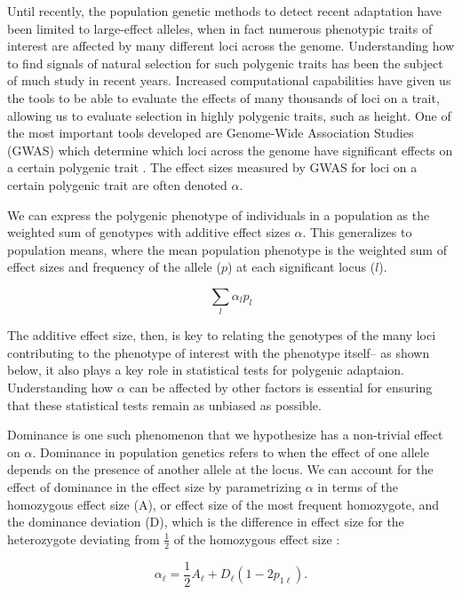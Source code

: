 \documentclass[a4paper,12pt]{article}
\begin{document}
Until recently, the population genetic methods to detect recent adaptation have been limited to
large-effect alleles, when in fact numerous phenotypic traits of interest
are affected by many different loci across the genome. Understanding
how to find signals of natural selection for such polygenic traits has been
the subject of much study in recent years. Increased computational
capabilities have given us the tools to be able to evaluate the effects
of many thousands of loci on a trait, allowing us to evaluate
selection in highly polygenic traits, such as height. One of the most
important tools developed are Genome-Wide Association Studies (GWAS)
which determine which loci across the genome have significant effects
on a certain polygenic trait \cite{gwasoverview}. The effect sizes
measured by GWAS for loci on a certain polygenic trait are often
denoted $\alpha$.

We can express the polygenic phenotype of individuals in a population
as the weighted sum of genotypes with additive effect sizes
$\alpha$. This generalizes to population means, where the mean
population phenotype is the weighted sum of effect sizes and frequency
of the allele ($p$) at each significant locus ($l$). \cite{gillespie}

\begin{equation}
  \sum_l{\alpha_lp_l}
\end{equation}

The additive effect size, then, is key to relating the genotypes of
the many loci contributing to the phenotype of interest with the
phenotype itself-- as shown below, it also plays a key role in statistical tests for
polygenic adaptaion. Understanding how $\alpha$ can be
affected by other factors is essential for ensuring that these
statistical tests remain as unbiased as possible. 

Dominance is one such phenomenon that we hypothesize has a non-trivial
effect on $\alpha$. Dominance in population genetics refers to when the effect of one
allele depends on the presence of another allele at the locus. We can account for
the effect of dominance in the effect size by parametrizing $\alpha$
in terms of the homozygous effect size (A), or effect size of the most frequent homozygote, and the
dominance deviation (D), which is the difference in effect size for the heterozygote
deviating from $\frac{1}{2}$ of the homozygous effect size \cite{gillespie}:

\begin{equation}  
  \alpha_\ell = \frac{1}{2} A_\ell + D_\ell\left(1-2p_{1\ell}\right).
  \label{alpha}
\end{equation}
\end{document}

